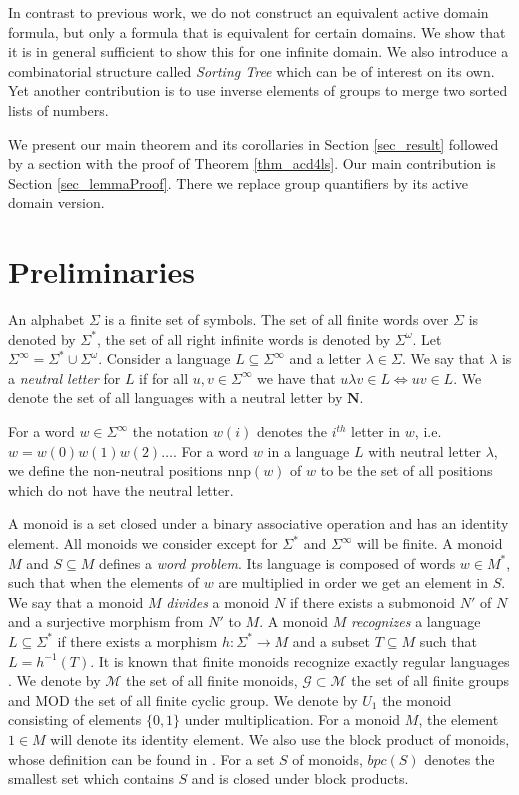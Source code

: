 \documentclass[envcountsame]{llncs}
\newcommand{\nnp}{\mathrm{nnp}}
\newcommand{\MOD}{\mathrm{MOD}}
\newcommand{\NL}{\mathbf{N}}
\begin{document}
In contrast to previous work, we do not construct an equivalent active domain formula, but only a formula that is equivalent for certain domains. We show that it is in general sufficient to show this for one infinite domain. We also introduce a combinatorial structure called \emph{Sorting Tree} which can be of interest on its own. Yet another contribution is to use inverse elements of groups to merge two sorted lists of numbers. 



\noindent We present our main theorem and its corollaries in Section \ref{sec_result} followed by a section with the proof of Theorem
\ref{thm_acd4ls}. Our main contribution is 
Section \ref{sec_lemmaProof}. There we replace group quantifiers by its active domain version. 

\bigskip
\section{Preliminaries} \label{sec_prelims}
An alphabet $\Sigma$ is a finite set of symbols. The set of all finite words over $\Sigma$ is denoted by $\Sigma^*$, the set of all right infinite words is denoted by $\Sigma^{\omega}$. Let $\Sigma^{\infty} = \Sigma^* \cup \Sigma^{\omega}$.  Consider a language $L \subseteq \Sigma^{\infty}$ and a letter $\lambda \in \Sigma$. We say that $\lambda$ is a \emph{neutral letter} for $L$ if for all $u,v \in \Sigma^{\infty}$ we have that $u\lambda v \in L \Leftrightarrow uv \in L$. We denote the set of all languages with a neutral letter by $\NL$. 

For a word $w\in\Sigma^\infty$ 
the notation $w(i)$ denotes the $i^{th}$ letter in $w$, i.e. $w=w(0)w(1)w(2)\dots$.
For a word $w$ in a language $L$ with neutral letter $\lambda$, we define the non-neutral positions $\nnp(w)$ of $w$ to be the set of all positions which do not have the neutral letter. 


A monoid is a set closed under a binary associative operation and has an identity element. All monoids we consider except for $\Sigma^*$ and $\Sigma^\infty$ will be finite. A monoid $M$ and $S \subseteq M$ defines a \emph{word problem}. Its language is composed of words $w \in M^*$, such that when the elements of $w$ are multiplied in order we get an element in $S$. 
We say that a monoid $M$ \emph{divides} a monoid $N$ if there exists a submonoid $N'$ of $N$ and a surjective morphism from $N'$ to
$M$. A monoid $M$ \emph{recognizes} a language $L\subseteq \Sigma^*$ if there exists a morphism $h:\Sigma^* \rightarrow M$ and a subset
$T \subseteq M$ such that $L = h^{-1}(T)$. It is known that finite monoids recognize exactly regular languages \cite{str_cirBook}. We
denote by $\mathcal{M}$ the set of all finite monoids, $\mathcal{G \subset M}$ the set of all finite groups and $\MOD$ the set of all
finite cyclic group. We denote by $U_1$ the monoid consisting of elements $\{0,1\}$ under multiplication. For a monoid $M$, the element
$1 \in M$ will denote its identity element. We also use the block product of monoids, whose definition can be found in
\cite{str_cirBook}. For a set $S$ of monoids, $bpc(S)$ denotes the smallest set which contains $S$ and is closed under block products. 
\end{document}

